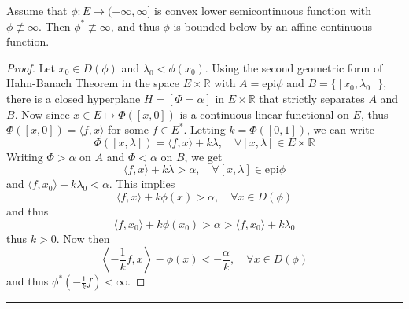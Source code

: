 \begin{prop} Assume that $\phi:E\rightarrow (-\infty,\infty]$ is convex lower semicontinuous function with $\phi\not\equiv \infty$. Then $\phi^*\not\equiv\infty$, and thus $\phi$ is bounded below by an affine continuous function.
\end{prop}
\begin{proof}
Let $x_0\in D(\phi)$ and $\lambda_0<\phi(x_0)$. Using the second geometric form of Hahn-Banach Theorem in the space $E\times \mathbb{R}$ with $A=\textrm{epi}\phi$ and $B=\{[x_0,\lambda_0]\}$, there is a closed hyperplane $H=[\Phi=\alpha]$ in $E\times \mathbb{R}$ that strictly separates $A$ and $B$. Now since $x\in E\mapsto \Phi([x,0])$ is a continuous linear functional on $E$, thus $\Phi([x,0])=\langle f,x\rangle$ for some $f\in E^*$. Letting $k=\Phi([0,1])$, we can write
\begin{equation}
\Phi([x,\lambda])=\langle f,x\rangle+k\lambda,\quad \forall[x,\lambda]\in E\times \mathbb{R}
\end{equation}
Writing $\Phi>\alpha$ on $A$ and $\Phi<\alpha$ on $B$, we get
\begin{equation}
\langle f,x\rangle+k\lambda>\alpha,\quad \forall[x,\lambda]\in \textrm{epi}\phi
\end{equation}
and $\langle f,x_0\rangle+k\lambda_0<\alpha$. This implies
\begin{equation}
\langle f,x\rangle+k\phi(x)>\alpha,\quad \forall x\in D(\phi)
\end{equation}
and thus
\begin{equation}
\langle f,x_0\rangle+k\phi(x_0)>\alpha>\langle f,x_0\rangle+k\lambda_0
\end{equation}
thus $k>0$. Now then
\begin{equation}
\left\langle -\frac{1}{k} f,x\right\rangle-\phi(x)<-\frac{\alpha}{k},\quad \forall x\in D(\phi)
\end{equation}
and thus $\phi^*(-\frac{1}{k}f)<\infty$.
\end{proof}

\noindent\rule{\textwidth}{1pt}
\newline